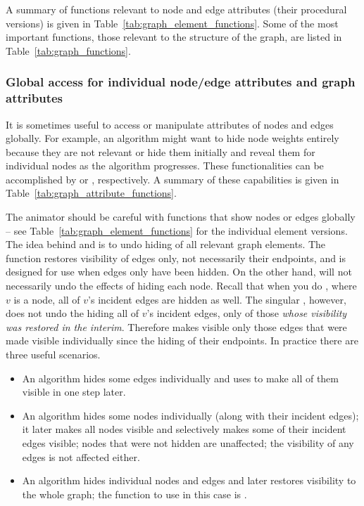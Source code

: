 

A summary of functions relevant to node and edge attributes (their procedural versions)
is given in Table~\ref{tab:graph_element_functions}.
Some of the most important functions, those relevant to the structure of the
graph, are listed in Table~\ref{tab:graph_functions}.

\subsubsection{Global access for individual node/edge attributes and graph attributes}



It is sometimes useful to access or manipulate attributes of nodes and edges
globally.
For example, an algorithm might want to hide node weights entirely
because they are not relevant
or hide them initially and reveal them for individual nodes as
the algorithm progresses.
These functionalities can be accomplished by
 or , respectively.
A summary of these capabilities is given in Table~\ref{tab:graph_attribute_functions}.

The animator should be careful with functions that show nodes or edges
globally -- see Table~\ref{tab:graph_element_functions} for the individual
element versions. The idea behind  and  is to
undo hiding of all relevant graph elements.  The function 
restores visibility of edges only, not necessarily their endpoints, and is
designed for use when edges only have been hidden.  On the other hand,
 will not necessarily undo the effects of hiding each node.
Recall that when you do , where $v$ is a node, all of $v$'s
incident edges are hidden as well.  The singular , however,
does not undo the hiding all of $v$'s incident edges, only of those
\emph{whose visibility was restored in the interim}.
Therefore  makes visible only those edges that were made
visible individually since the hiding of their endpoints.
In practice there are three useful scenarios.
\begin{itemize}
\item An algorithm hides some edges individually and uses  to
  make all of them visible in one step later.
\item An algorithm hides some nodes individually (along with their incident
  edges); it later makes all nodes visible and selectively makes some of
  their incident edges visible; nodes that were not hidden are unaffected;
  the visibility of any edges is not affected either.
\item An algorithm hides individual nodes and edges and later restores
  visibility to the whole graph; the function to use in this case is
  .
\end{itemize}

